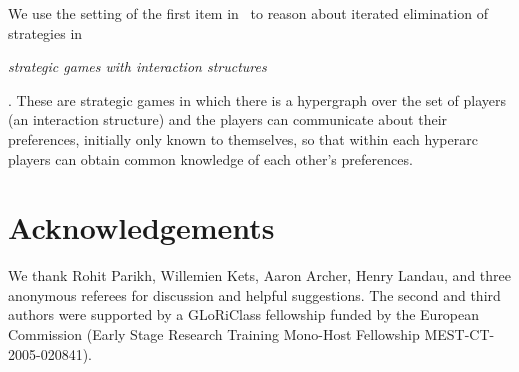 \documentclass{article}
\let\cite\citep
\newcounter{#1}
\newcommand{\oldbfe}[1]{\begin{bfseries}\emph{#1}\end{bfseries}}
\begin{document}
We use the setting of the first item in~\cite{apt_strategy_2009} to reason
about iterated elimination of strategies in \oldbfe{strategic games with interaction structures}.
These are strategic games in which there is a hypergraph over the set
of players (an interaction structure) and
the players can communicate about their preferences, initially only known to themselves,
so that within each hyperarc players can obtain common knowledge of each other's
preferences.






\section*{Acknowledgements}
\label{sec:acknowledgements}

We thank Rohit Parikh, Willemien Kets, Aaron Ar\-cher, Henry Landau,
and three anonymous referees for discussion and helpful suggestions.
The second and third authors were supported by a GLoRiClass fellowship
funded by the European Commission (Early Stage Research Training
Mono-Host Fellowship MEST-CT-2005-020841).
\end{document}
